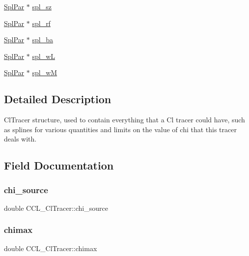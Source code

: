 \begin{DoxyCompactItemize}
\mbox{\hyperlink{struct_spl_par}{Spl\+Par}} $\ast$ \mbox{\hyperlink{struct_c_c_l___cl_tracer_a05f318f42d39d6fcb15dbb7ca23c45eb}{spl\+\_\+sz}}
\item 
\mbox{\hyperlink{struct_spl_par}{Spl\+Par}} $\ast$ \mbox{\hyperlink{struct_c_c_l___cl_tracer_a9895e56acfba92f8448a68acbf32c495}{spl\+\_\+rf}}
\item 
\mbox{\hyperlink{struct_spl_par}{Spl\+Par}} $\ast$ \mbox{\hyperlink{struct_c_c_l___cl_tracer_a6465ff884a3b359995b014a9165738cf}{spl\+\_\+ba}}
\item 
\mbox{\hyperlink{struct_spl_par}{Spl\+Par}} $\ast$ \mbox{\hyperlink{struct_c_c_l___cl_tracer_abae070ecb7e732d57565472d37b89604}{spl\+\_\+wL}}
\item 
\mbox{\hyperlink{struct_spl_par}{Spl\+Par}} $\ast$ \mbox{\hyperlink{struct_c_c_l___cl_tracer_aa631eb8b59ffa185566d445558992958}{spl\+\_\+wM}}
\end{DoxyCompactItemize}


\subsection{Detailed Description}
Cl\+Tracer structure, used to contain everything that a Cl tracer could have, such as splines for various quantities and limits on the value of chi that this tracer deals with. 

\subsection{Field Documentation}
\mbox{\label{struct_c_c_l___cl_tracer_a30b515b52f45e8281846749af76756ad}} 
\subsubsection{\texorpdfstring{chi\+\_\+source}{chi\_source}}
{\footnotesize\ttfamily double C\+C\+L\+\_\+\+Cl\+Tracer\+::chi\+\_\+source}

\mbox{\label{struct_c_c_l___cl_tracer_abecca79aa244fbc52bb07faece651988}} 
\subsubsection{\texorpdfstring{chimax}{chimax}}
{\footnotesize\ttfamily double C\+C\+L\+\_\+\+Cl\+Tracer\+::chimax}

